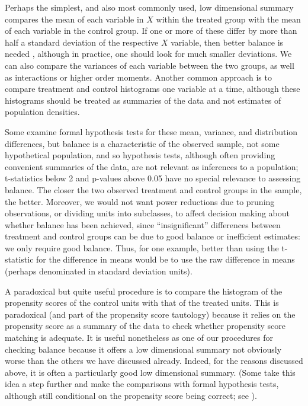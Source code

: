\documentclass[11pt,titlepage]{article}
\begin{document}
Perhaps the simplest, and also most commonly used, low dimensional
summary compares the mean of each variable in $X$ within the treated
group with the mean of each variable in the control group.  If one or
more of these differ by more than half a standard deviation of the
respective $X$ variable, then better balance is needed
\citep{Cochran68}, although in practice, one should look for much
smaller deviations.  We can also compare the variances of each
variable between the two groups, as well as interactions or higher
order moments.  Another common approach is to compare treatment and
control histograms one variable at a time, although these histograms
should be treated as summaries of the data and not estimates of
population densities.  

Some examine formal hypothesis tests for these mean, variance, and
distribution differences, but balance is a characteristic of the
observed sample, not some hypothetical population, and so hypothesis
tests, although often providing convenient summaries of the data, are
not relevant as inferences to a population; t-statistics below 2 and
p-values above 0.05 have no special relevance to assessing balance.
The closer the two observed treatment and control groups in the
sample, the better.  Moreover, we would not want power reductions due
to pruning observations, or dividing units into subclasses, to affect
decision making about whether balance has been achieved, since
``insignificant'' differences between treatment and control groups can
be due to good balance or inefficient estimates: we only require good
balance.  Thus, for one example, better than using the t-statistic for
the difference in means would be to use the raw difference in means
(perhaps denominated in standard deviation units).

A paradoxical but quite useful procedure is to compare the histogram
of the propensity scores of the control units with that of the treated
units. This is paradoxical (and part of the propensity score
tautology) because it relies on the propensity score as a summary of
the data to check whether propensity score matching is adequate.  It
is useful nonetheless as one of our procedures for checking balance
because it offers a low dimensional summary not obviously worse than
the others we have discussed already.  Indeed, for the reasons
discussed above, it is often a particularly good low dimensional
summary. (Some take this idea a step further and make the comparisons
with formal hypothesis tests, although still conditional on the
propensity score being correct; see \citealp{Sekhon04b}).
\end{document}
